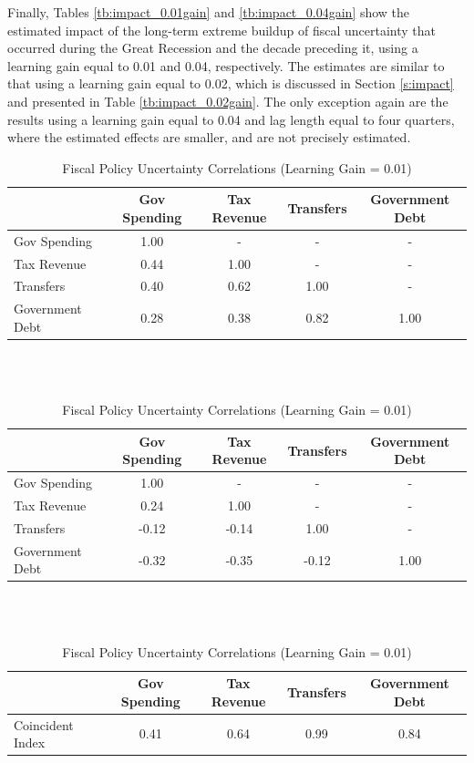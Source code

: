 \documentclass[11pt]{article}
\begin{document}
Finally, Tables \ref{tb:impact_0.01gain} and \ref{tb:impact_0.04gain} show the estimated impact of the long-term extreme buildup of fiscal uncertainty that occurred during the Great Recession and the decade preceding it, using a learning gain equal to 0.01 and 0.04, respectively.  The estimates are similar to that using a learning gain equal to 0.02, which is discussed in Section \ref{s:impact} and presented in Table \ref{tb:impact_0.02gain}.  The only exception again are the results using a learning gain equal to 0.04 and lag length equal to four quarters, where the estimated effects are smaller, and are not precisely estimated.


\renewcommand*\thetable{A\arabic{table}}
\setcounter{table}{0}

\begin{table}[t]\caption{Fiscal Policy Uncertainty Correlations (Learning Gain = 0.01)}\label{tb:fpucorrel0.01}
\begin{center}
\begin{tabular}{l|cccc}
 & Gov Spending & Tax Revenue & Transfers & Government Debt \\ \hline
Gov Spending & 1.00 & - & - & - \\
Tax Revenue & 0.44 & 1.00 & - & - \\
Transfers & 0.40 & 0.62 & 1.00 & - \\
Government Debt & 0.28 & 0.38 & 0.82 & 1.00 \\ \hline
\end{tabular}

\ \\ \ \\
\begin{tabular}{l|cccc}
 & Gov Spending & Tax Revenue & Transfers & Government Debt \\ \hline
Gov Spending & 1.00 & - & - & - \\
Tax Revenue & 0.24 & 1.00 & - & - \\
Transfers & -0.12 & -0.14 & 1.00 & - \\
Government Debt & -0.32 & -0.35 & -0.12 & 1.00 \\ \hline
\end{tabular}

\ \\ \ \\

\begin{tabular}{l|cccc}
 & Gov Spending & Tax Revenue & Transfers & Government Debt \\ \hline
Coincident Index~ & 0.41 & 0.64 & 0.99 & 0.84 \\ \hline
\end{tabular}
\end{center}
\end{table}
\end{document}
